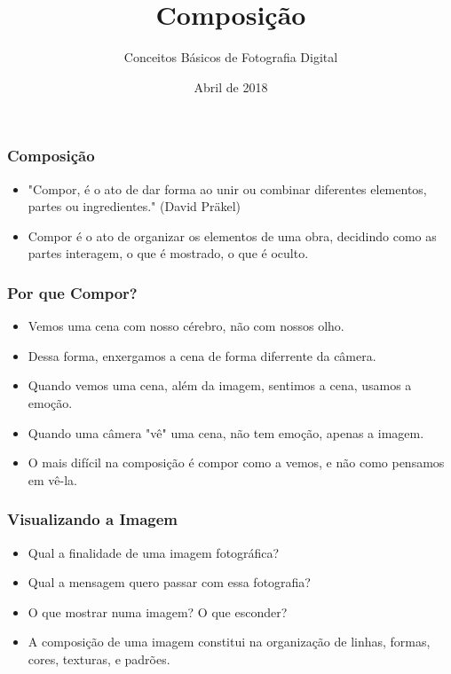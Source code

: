 


\subtitle{Conceitos Básicos de Fotografia Digital}
\title{Composição}
\author{}
\date{Abril de 2018}



\coverframe

\begin{frame}
    \frametitle{Composição}
    \begin{itemize}
      \item "Compor, é o ato de dar forma ao unir ou combinar diferentes elementos,
      partes ou ingredientes." (David Präkel)
      \item Compor é o ato de organizar os elementos de uma obra, decidindo como
      as partes interagem, o que é mostrado, o que é oculto.
    \end{itemize}
\end{frame}

\begin{frame}
    \frametitle{Por que Compor?}
    \begin{itemize}
      \item Vemos uma cena com nosso cérebro, não com nossos olho.
      \item Dessa forma, enxergamos a cena de forma diferrente da câmera.
      \item Quando vemos uma cena, além da imagem, sentimos a cena, usamos a emoção.
      \item Quando uma câmera "vê" uma cena, não tem emoção, apenas a imagem.
      \item O mais difícil na composição é compor como a vemos, e não como pensamos em vê-la.
    \end{itemize}
\end{frame}

\begin{frame}
    \frametitle{Visualizando a Imagem}
    \begin{itemize}
      \item Qual a finalidade de uma imagem fotográfica?
      \item Qual a mensagem quero passar com essa fotografia?
      \item O que mostrar numa imagem? O que esconder?
      \item A composição de uma imagem constitui na organização de linhas, formas,
      cores, texturas, e padrões.
    \end{itemize}
\end{frame}

